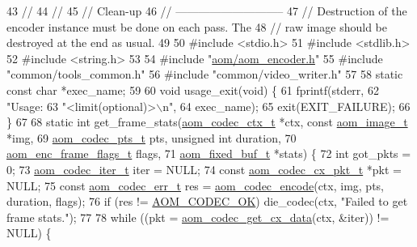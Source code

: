 \begin{DoxyCodeInclude}
43 \textcolor{comment}{//}
44 \textcolor{comment}{//}
45 \textcolor{comment}{// Clean-up}
46 \textcolor{comment}{// -----------------------------}
47 \textcolor{comment}{// Destruction of the encoder instance must be done on each pass. The}
48 \textcolor{comment}{// raw image should be destroyed at the end as usual.}
49 
50 \textcolor{preprocessor}{#include <stdio.h>}
51 \textcolor{preprocessor}{#include <stdlib.h>}
52 \textcolor{preprocessor}{#include <string.h>}
53 
54 \textcolor{preprocessor}{#include "\hyperlink{aom__encoder_8h}{aom/aom\_encoder.h}"}
55 \textcolor{preprocessor}{#include "common/tools\_common.h"}
56 \textcolor{preprocessor}{#include "common/video\_writer.h"}
57 
58 \textcolor{keyword}{static} \textcolor{keyword}{const} \textcolor{keywordtype}{char} *exec\_name;
59 
60 \textcolor{keywordtype}{void} usage\_exit(\textcolor{keywordtype}{void}) \{
61   fprintf(stderr,
62           \textcolor{stringliteral}{"Usage: %
63           \textcolor{stringliteral}{"<limit(optional)>\(\backslash\)n"},
64           exec\_name);
65   exit(EXIT\_FAILURE);
66 \}
67 
68 \textcolor{keyword}{static} \textcolor{keywordtype}{int} get\_frame\_stats(\hyperlink{structaom__codec__ctx}{aom\_codec\_ctx\_t} *ctx, \textcolor{keyword}{const} 
      \hyperlink{structaom__image}{aom\_image\_t} *img,
69                            \hyperlink{group__encoder_ga958524226c9a65251c9e4f7bb78fc606}{aom\_codec\_pts\_t} pts, \textcolor{keywordtype}{unsigned} \textcolor{keywordtype}{int} duration,
70                            \hyperlink{group__encoder_gacbef92200b831adb94283f84128f83de}{aom\_enc\_frame\_flags\_t} flags,
71                            \hyperlink{structaom__fixed__buf}{aom\_fixed\_buf\_t} *stats) \{
72   \textcolor{keywordtype}{int} got\_pkts = 0;
73   \hyperlink{group__codec_gadf9e173c9e02788a9999399edab20a02}{aom\_codec\_iter\_t} iter = NULL;
74   \textcolor{keyword}{const} \hyperlink{structaom__codec__cx__pkt}{aom\_codec\_cx\_pkt\_t} *pkt = NULL;
75   \textcolor{keyword}{const} \hyperlink{group__codec_gaaae61e0f8663e6137f1e228757248e7c}{aom\_codec\_err\_t} res = \hyperlink{group__encoder_ga6f4a777de5389771e783df7ff1f116d4}{aom\_codec\_encode}(ctx, img, pts, duration, 
      flags);
76   \textcolor{keywordflow}{if} (res != \hyperlink{group__codec_ggaaae61e0f8663e6137f1e228757248e7caf145dc2f86014a08ebad36ac2b140001}{AOM\_CODEC\_OK}) die\_codec(ctx, \textcolor{stringliteral}{"Failed to get frame stats."});
77 
78   \textcolor{keywordflow}{while} ((pkt = \hyperlink{group__encoder_gaedc4c56b60d4217677cb561066360884}{aom\_codec\_get\_cx\_data}(ctx, &iter)) != NULL) \{
}
\end{DoxyCodeInclude}
